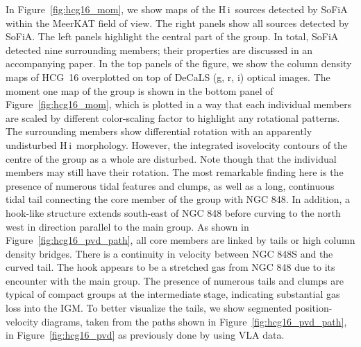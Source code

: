 \documentclass{aa}
\newcommand{\HI}{H\,{\sc i}}
\begin{document}
%

In  Figure~\ref{fig:hcg16_mom}, we show maps of the \HI\ sources detected by SoFiA within the MeerKAT field of view. 
The right panels show all sources detected by SoFiA. The left panels highlight the central part of the group. In total, 
SoFiA detected nine surrounding members; their properties are discussed in an accompanying paper. In the top panels of the figure, we show the column density maps of HCG~16 
overplotted on top of DeCaLS (g, r, i) optical images. The moment one map of the group is shown in the bottom panel of Figure~\ref{fig:hcg16_mom}, which is 
plotted in a way that each individual members are scaled by different color-scaling factor to highlight any rotational 
patterns. The surrounding members show differential rotation with an apparently undisturbed \HI\ morphology. 
However, the integrated isovelocity contours of the centre of the group as a whole are disturbed. Note though that the individual members may still have their rotation. 
The most remarkable finding here is the presence of numerous tidal features and clumps, as well as a long, continuous tidal tail connecting the core member of the group with NGC 848. 
In addition, a hook-like structure extends south-east of NGC 848 before curving to the north west in direction parallel to the main group. 
As shown in Figure~\ref{fig:hcg16_pvd_path}, all core members are linked by tails or high column density bridges. 
There is a continuity in velocity between NGC 848S and the curved tail. The hook appears to be a stretched gas from NGC 848 due to its encounter with the main group. 
The presence of numerous tails and clumps are typical of compact groups at the intermediate stage, indicating substantial gas loss into the IGM. 
To better visualize the tails, we show segmented position-velocity diagrams, taken from the paths shown in Figure~\ref{fig:hcg16_pvd_path}, 
in Figure~\ref{fig:hcg16_pvd} as previously done by \citet{2019A&A...632A..78J} using VLA data. 
\end{document}
